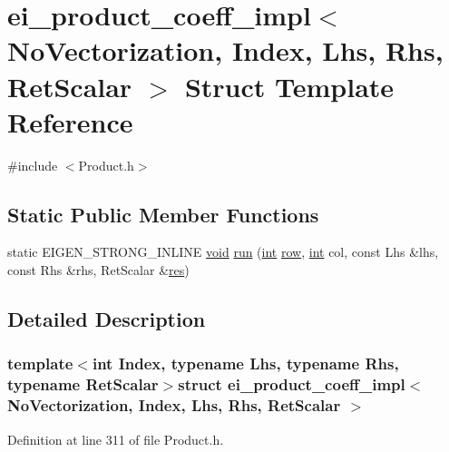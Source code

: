 \hypertarget{structei__product__coeff__impl_3_01_no_vectorization_00_01_index_00_01_lhs_00_01_rhs_00_01_ret_scalar_01_4}{\section{ei\-\_\-product\-\_\-coeff\-\_\-impl$<$ No\-Vectorization, Index, Lhs, Rhs, Ret\-Scalar $>$ Struct Template Reference}
\label{structei__product__coeff__impl_3_01_no_vectorization_00_01_index_00_01_lhs_00_01_rhs_00_01_ret_scalar_01_4}
}


{\ttfamily \#include $<$Product.\-h$>$}

\subsection*{Static Public Member Functions}
\begin{DoxyCompactItemize}
\item 
static E\-I\-G\-E\-N\-\_\-\-S\-T\-R\-O\-N\-G\-\_\-\-I\-N\-L\-I\-N\-E \hyperlink{group___u_a_v_objects_plugin_ga444cf2ff3f0ecbe028adce838d373f5c}{void} \hyperlink{structei__product__coeff__impl_3_01_no_vectorization_00_01_index_00_01_lhs_00_01_rhs_00_01_ret_scalar_01_4_a9819318689782bc5eb3e770d5a43f7f0}{run} (\hyperlink{ioapi_8h_a787fa3cf048117ba7123753c1e74fcd6}{int} \hyperlink{glext_8h_a11b277b422822f784ee248b43eee3e1e}{row}, \hyperlink{ioapi_8h_a787fa3cf048117ba7123753c1e74fcd6}{int} col, const Lhs \&lhs, const Rhs \&rhs, Ret\-Scalar \&\hyperlink{glext_8h_a1dbb21208b9047cc8031ca9c840d3c2f}{res})
\end{DoxyCompactItemize}


\subsection{Detailed Description}
\subsubsection*{template$<$int Index, typename Lhs, typename Rhs, typename Ret\-Scalar$>$struct ei\-\_\-product\-\_\-coeff\-\_\-impl$<$ No\-Vectorization, Index, Lhs, Rhs, Ret\-Scalar $>$}



Definition at line 311 of file Product.\-h.



